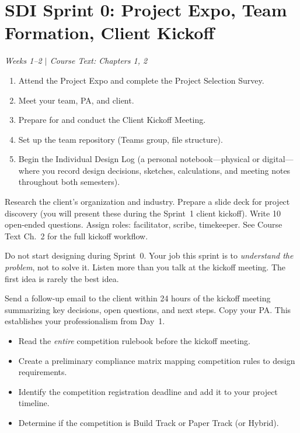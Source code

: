 \section{SDI Sprint 0: Project Expo, Team Formation, Client Kickoff}
\textit{Weeks 1--2 $|$ Course Text: Chapters 1, 2}

\begin{priorities}
\begin{enumerate}[nosep]
\item Attend the Project Expo and complete the Project Selection Survey.
\item Meet your team, PA, and client.
\item Prepare for and conduct the Client Kickoff Meeting.
\item Set up the team repository (Teams group, file structure).
\item Begin the Individual Design Log (a personal notebook---physical or digital---where you record design decisions, sketches, calculations, and meeting notes throughout both semesters).
\end{enumerate}
\end{priorities}

\begin{faqbox}
Research the client's organization and industry. Prepare a slide deck for project discovery (you will present these during the Sprint~1 client kickoff). Write 10 open-ended questions. Assign roles: facilitator, scribe, timekeeper. See Course Text Ch.~2 for the full kickoff workflow.
\end{faqbox}

\begin{warnbox}
Do not start designing during Sprint~0. Your job this sprint is to \emph{understand the problem}, not to solve it. Listen more than you talk at the kickoff meeting. The first idea is rarely the best idea.
\end{warnbox}

\begin{protip}
Send a follow-up email to the client within 24 hours of the kickoff meeting summarizing key decisions, open questions, and next steps. Copy your PA. This establishes your professionalism from Day~1.
\end{protip}

\begin{faqbox}
\begin{itemize}[nosep]
\item Read the \emph{entire} competition rulebook before the kickoff meeting.
\item Create a preliminary compliance matrix mapping competition rules to design requirements.
\item Identify the competition registration deadline and add it to your project timeline.
\item Determine if the competition is Build Track or Paper Track (or Hybrid).
\end{itemize}
\end{faqbox}

